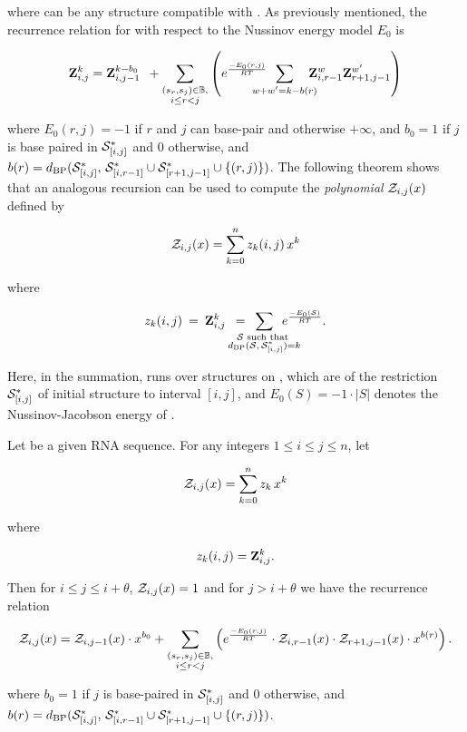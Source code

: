where \str can be any structure compatible with \seq.
As previously mentioned, the recurrence relation for \rnabor
with respect to the Nussinov energy model $E_0$ is

\begin{align}
\label{eq:fftbor:rnaborNuss}
\bfZ{k}{i,j} = \bfZ{k-b_0}{i,j-1}\enspace +
\sum_{\substack{(s_r,s_j) \in \bpSet, \\ i \le r<j}}
\left(
\boltzNuss{r,j}\enspace \sum_{\mathclap{w+w'=k-b(r)}}\quad
\bfZ{w}{i,r-1} \bfZ{w'}{r+1,j-1}
\right)
\end{align}

where $E_0(r,j)=-1$ if $r$ and $j$ can base-pair and otherwise
$+\infty$, and
$b_0 = 1$ if $j$ is base paired in $\mathcal S^*_{[i,j]}$ and $0$ otherwise, and
$b(r)=d_{\text{BP}}(\mathcal S^*_{[i,j]},\,\mathcal S^*_{[i,r-1]} \cup \mathcal S^*_{[r+1,j-1]} \cup\{(r,j)\})$.
The following theorem shows that an analogous recursion can be used to compute
the {\em polynomial} ${\mathcal Z}_{i,j}(x)$ defined by

\begin{align}
\label{eq:fftbor:polynomialZij}
\emZ{i,j} = \sum_{k=0}^n z_k(i,j)\,x^k
\end{align}

where

\begin{align}
z_k(i,j)\>=\>
\bfZ{k}{i,j}\enspace=\enspace
\sum_{\mathclap{\substack{\str \text{ such that } \\
\dBP{\str}{\strSt_{[i,j]}}=k}}}\enspace
\boltzNuss{\str}.
\end{align}

Here, in the summation, \str runs over structures on \seqIJ, which
are \kNbrs of the restriction $\mathcal S^*_{[i,j]}$ of initial structure
\strSt to interval $[i,j]$, and
$E_0(S)=-1 \cdot |S|$ denotes the Nussinov-Jacobson energy of \str.

\begin{theorem}
\label{thm:fftbor:recursions}
Let \seqN be a given RNA sequence.
For any integers $1 \leq i \leq j \leq n$, let

\begin{align}
{\mathcal Z}_{i,j}(x) = \sum_{k=0}^n z_k\,x^k
\end{align}

where

\begin{align}
z_k(i,j) = {\bf Z}^{k}_{i,j}.
\end{align}

Then for $i\leq j \leq i+\theta$, ${\mathcal Z}_{i,j}(x)=1$ and for
$j>i+\theta$ we have the recurrence relation

\begin{align}
\label{eq:fftbor:fftborNussPoly}
\emZ{i,j} = \emZ{i,j-1} \cdot x^{b_0} +
\sum_{\substack{(s_r,s_j) \in \bpSet, \\ i\le r<j}}
\left(
\boltzNuss{r,j} \cdot \emZ{i,r-1} \cdot \emZ{r+1,j-1} \cdot x^{b(r)}
\right).
\end{align}

where $b_0 = 1$ if $j$ is base-paired in $\mathcal S^*_{[i,j]}$ and $0$ otherwise, and
$b(r) =
d_{\text{BP}}(\mathcal S^*_{[i,j]},\,\mathcal S^*_{[i,r-1]} \cup \mathcal S^*_{[r+1,j-1]} \cup \{(r,j)\})$.
\end{theorem}

